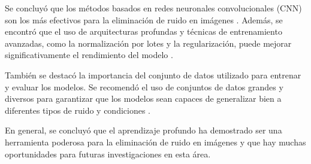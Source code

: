 \documentclass[a4paper,
               ]{jacow}
\begin{document}
Se concluyó que los métodos basados en redes neuronales convolucionales (CNN) son los más efectivos para la eliminación de ruido en imágenes \cite{zhang2017beyond, lehtinen2018noise2noise, tai2017image}. Además, se encontró que el uso de arquitecturas profundas y técnicas de entrenamiento avanzadas, como la normalización por lotes y la regularización, puede mejorar significativamente el rendimiento del modelo \cite{lefkimmiatis2018universal}.

También se destacó la importancia del conjunto de datos utilizado para entrenar y evaluar los modelos. Se recomendó el uso de conjuntos de datos grandes y diversos para garantizar que los modelos sean capaces de generalizar bien a diferentes tipos de ruido y condiciones \cite{zhang2018learning}.

En general, se concluyó que el aprendizaje profundo ha demostrado ser una herramienta poderosa para la eliminación de ruido en imágenes y que hay muchas oportunidades para futuras investigaciones en esta área.
\end{document}
